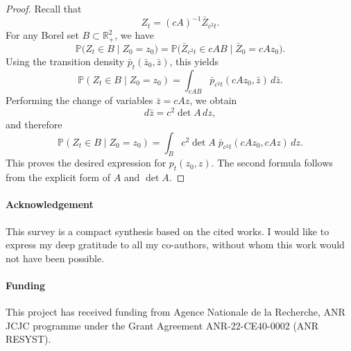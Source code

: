\documentclass[11pt]{article}
\theoremstyle{definition}
\begin{document}
\begin{proof}
Recall that
\[
Z_t = (cA)^{-1} \bar Z_{c^2 t}.
\]
For any Borel set $B \subset \mathbb{R}_+^2$, we have
\[
\mathbb{P}\big(Z_t \in B \mid Z_0=z_0\big)
=
\mathbb{P}\Big(\bar Z_{c^2 t} \in cA B \mid \bar Z_0=cA z_0\Big).
\]
Using the transition density $\bar p_t(\bar z_0,\bar z)$, this yields
\[
\mathbb{P}(Z_t \in B \mid Z_0=z_0)
=
\int_{cA B} \bar p_{c^2 t}(cA z_0,\bar z)\, d\bar z.
\]
Performing the change of variables $\bar z = cA z$, we obtain
\[
d\bar z = c^2 \det A\, dz,
\]
and therefore
\[
\mathbb{P}(Z_t \in B \mid Z_0=z_0)
=
\int_B c^2 \det A\;
\bar p_{c^2 t}(cA z_0, cA z)\, dz.
\]
This proves the desired expression for $p_t(z_0,z)$. The second formula follows from the explicit form of $A$ and $\det A$.
\end{proof}




\paragraph{Acknowledgement}
This survey is a compact synthesis based on the cited works. I would like to express my deep gratitude to all my co-authors, without whom this work would not have been possible.

\paragraph{Funding}
This project has received funding from Agence Nationale de la Recherche, ANR JCJC programme under the Grant Agreement ANR-22-CE40-0002 (ANR RESYST).
\end{document}

